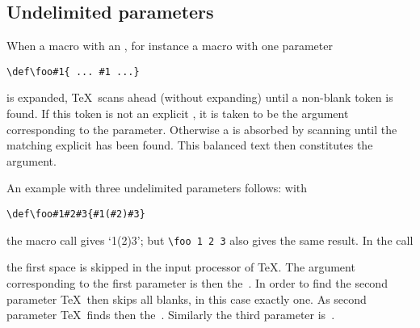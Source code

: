 \documentclass[letterpaper]{book}
\begin{document}
\subsection{Undelimited parameters}

When a macro with an , for instance
a macro  with one parameter
\begin{verbatim}
\def\foo#1{ ... #1 ...}
\end{verbatim}
is expanded, \TeX\ scans ahead (without expanding)
until a non-blank token is found.
If this token is not an explicit , 
it is taken to be the argument
corresponding to the parameter. Otherwise a 
is absorbed by scanning until the matching explicit
 has been found.
This balanced text then
constitutes the argument.

An example with three undelimited parameters follows: with
\begin{verbatim}
\def\foo#1#2#3{#1(#2)#3}
\end{verbatim}
the macro call  gives `\hbox{1(2)3}';
but \hbox{\verb-\foo 1 2 3-} also gives the same result.
In the call
\begin{disp}\end{disp}
the first space is skipped in the input processor of \TeX.
The argument corresponding to the first parameter is then
the~. In order to find the second parameter \TeX\ then
skips all blanks, in this case exactly one. As second
parameter \TeX\ finds then the~. Similarly the third
parameter is~.
\end{document}
